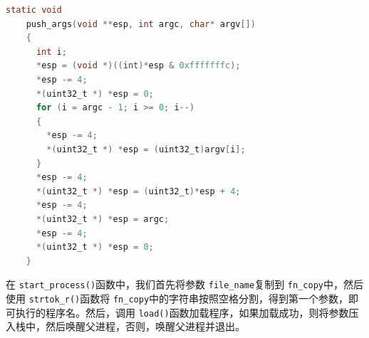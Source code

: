 \documentclass{article}
\begin{document}
\begin{lstlisting}[language=C, title=\texttt{src/userprog/process.c - push\_args()}]
    static void
    push_args(void **esp, int argc, char* argv[])
    {
      int i;
      *esp = (void *)((int)*esp & 0xfffffffc);
      *esp -= 4;
      *(uint32_t *) *esp = 0;
      for (i = argc - 1; i >= 0; i--)
      {
        *esp -= 4;
        *(uint32_t *) *esp = (uint32_t)argv[i];
      }
      *esp -= 4;
      *(uint32_t *) *esp = (uint32_t)*esp + 4;
      *esp -= 4;
      *(uint32_t *) *esp = argc;
      *esp -= 4;
      *(uint32_t *) *esp = 0;
    }
\end{lstlisting}

在 \texttt{start\_process()}函数中，我们首先将参数 \texttt{file\_name}复制到 \texttt{fn\_copy}中，然后使用 \texttt{strtok\_r()}函数将 \texttt{fn\_copy}中的字符串按照空格分割，得到第一个参数，即可执行的程序名。然后，调用 \texttt{load()}函数加载程序，如果加载成功，则将参数压入栈中，然后唤醒父进程，否则，唤醒父进程并退出。
\end{document}
